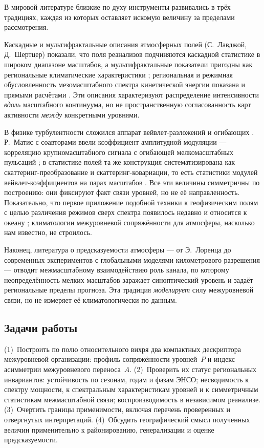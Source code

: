 \documentclass[11pt,a4paper]{article}
\begin{document}
В мировой литературе близкие по духу инструменты развивались в трёх традициях, каждая из которых оставляет искомую величину за пределами рассмотрения.

Каскадные и мультифрактальные описания атмосферных полей (С.~Лавджой, Д.~Шертцер) показали, что поля реанализов подчиняются каскадной статистике в широком диапазоне масштабов, а мультифрактальные показатели пригодны как региональные климатические характеристики \cite{LovejoySchertzer2013,Lovejoy2011}; региональная и режимная обусловленность мезомасштабного спектра кинетической энергии показана и прямыми расчётами \cite{Kouhen2024}. Эти описания характеризуют распределение интенсивности \emph{вдоль} масштабного континуума, но не пространственную согласованность карт активности \emph{между} конкретными уровнями.

В физике турбулентности сложился аппарат вейвлет-разложений и огибающих \cite{Farge1992}. Р.~Матис с соавторами ввели коэффициент амплитудной модуляции --- корреляцию крупномасштабного сигнала с огибающей мелкомасштабных пульсаций \cite{Mathis2009}; в статистике полей та же конструкция систематизирована как скаттеринг-преобразование и скаттеринг-ковариации, то есть статистики модулей вейвлет-коэффициентов на парах масштабов \cite{Mallat2012,BrunaMallat2013,Cheng2024}. Все эти величины симметричны по построению: они фиксируют факт связи уровней, но не её направленность. Показательно, что первое приложение подобной техники к геофизическим полям с целью различения режимов сверх спектра появилось недавно и относится к океану \cite{Skinner2025}; климатологии межуровневой сопряжённости для атмосферы, насколько нам известно, не строилось.

Наконец, литература о предсказуемости атмосферы --- от Э.~Лоренца \cite{Lorenz1969} до современных экспериментов с глобальными моделями километрового разрешения \cite{Zhang2007,RotunnoSnyder2008,Judt2020,SelzCraig2023} --- отводит межмасштабному взаимодействию роль канала, по которому неопределённость мелких масштабов заражает синоптический уровень и задаёт региональные пределы прогноза. Эта традиция \emph{моделирует} силу межуровневой связи, но не измеряет её климатологически по данным.

\subsection{Задачи работы}

(1)~Построить по полю относительного вихря два компактных дескриптора межуровневой организации: профиль сопряжённости уровней~$P$ и индекс асимметрии межуровневого переноса~$A$. (2)~Проверить их статус региональных инвариантов: устойчивость по сезонам, годам и фазам ЭНСО; несводимость к спектру мощности, к спектральным характеристикам уровней и к симметричным статистикам межмасштабной связи; воспроизводимость в независимом реанализе. (3)~Очертить границы применимости, включая перечень проверенных и отвергнутых интерпретаций. (4)~Обсудить географический смысл полученных величин применительно к районированию, генерализации и оценке предсказуемости.
\end{document}
